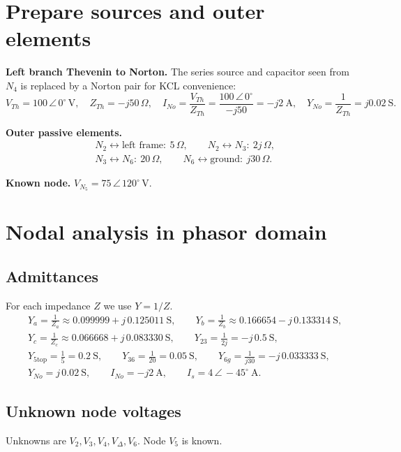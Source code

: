 \documentclass{article}
\newcommand{\ang}[1]{\,\angle\,#1^{\circ}}
\begin{document}
\section*{Prepare sources and outer elements}

\textbf{Left branch Thevenin to Norton.}
The series source and capacitor seen from $N_4$ is replaced by a Norton pair for KCL convenience:
\[
V_{Th}=100\ang{0}\,\mathrm{V},\quad Z_{Th}=-j50\,\Omega,\quad
I_{No}=\frac{V_{Th}}{Z_{Th}}=\frac{100\ang{0}}{-j50}=-j2\ \mathrm{A},\quad
Y_{No}=\frac{1}{Z_{Th}}=j0.02\ \mathrm{S}.
\]

\noindent\textbf{Outer passive elements.}
\[
\begin{aligned}
& N_2 \leftrightarrow \text{left frame}:\ 5\,\Omega,\qquad
N_2 \leftrightarrow N_3:\ 2j\,\Omega,\\
& N_3 \leftrightarrow N_6:\ 20\,\Omega,\qquad
N_6 \leftrightarrow \text{ground}:\ j30\,\Omega.
\end{aligned}
\]

\noindent\textbf{Known node.} $V_{N_5}=75\ang{120}\,\mathrm{V}$.

\section*{Nodal analysis in phasor domain}

\subsection*{Admittances}
For each impedance $Z$ we use $Y=1/Z$.
\[
\begin{aligned}
&Y_{a}= \frac{1}{Z_{a}}\approx 0.099999 + j\,0.125011\ \mathrm{S},\qquad
Y_{b}= \frac{1}{Z_{b}}\approx 0.166654 - j\,0.133314\ \mathrm{S},\\
&Y_{c}= \frac{1}{Z_{c}}\approx 0.066668 + j\,0.083330\ \mathrm{S},\qquad
Y_{23}= \frac{1}{2j}= -j\,0.5\ \mathrm{S},\\
&Y_{5\text{top}}= \frac{1}{5}=0.2\ \mathrm{S},\qquad
Y_{36}=\frac{1}{20}=0.05\ \mathrm{S},\qquad
Y_{6g}= \frac{1}{j30}= -j\,0.033333\ \mathrm{S},\\
&Y_{No}= j\,0.02\ \mathrm{S},\qquad
I_{No} = -j2\ \mathrm{A},\qquad
I_{s} = 4\ang{-45}\ \mathrm{A}.
\end{aligned}
\]

\subsection*{Unknown node voltages}
Unknowns are $V_2,V_3,V_4,V_{\Delta},V_6$. Node $V_5$ is known.
\end{document}
